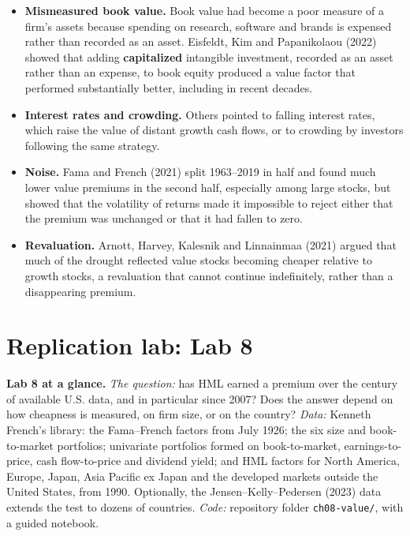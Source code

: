 \begin{itemize}
  \item \textbf{Mismeasured book value.} Book value had become a poor measure of a firm's assets because spending on research, software and brands is expensed rather than recorded as an asset. Eisfeldt, Kim and Papanikolaou (2022) showed that adding \textbf{capitalized} intangible investment, recorded as an asset rather than an expense, to book equity produced a value factor that performed substantially better, including in recent decades.
  \item \textbf{Interest rates and crowding.} Others pointed to falling interest rates, which raise the value of distant growth cash flows, or to crowding by investors following the same strategy.
  \item \textbf{Noise.} Fama and French (2021) split 1963--2019 in half and found much lower value premiums in the second half, especially among large stocks, but showed that the volatility of returns made it impossible to reject either that the premium was unchanged or that it had fallen to zero.
  \item \textbf{Revaluation.} Arnott, Harvey, Kalesnik and Linnainmaa (2021) argued that much of the drought reflected value stocks becoming cheaper relative to growth stocks, a revaluation that cannot continue indefinitely, rather than a disappearing premium.
\end{itemize}

\section{Replication lab: Lab 8}
\label{sec:08-lab}

\begin{callout}
\textbf{Lab 8 at a glance.} \emph{The question:} has HML earned a premium over the century of available U.S. data, and in particular since 2007? Does the answer depend on how cheapness is measured, on firm size, or on the country? \emph{Data:} Kenneth French's library: the Fama--French factors from July 1926; the six size and book-to-market portfolios; univariate portfolios formed on book-to-market, earnings-to-price, cash flow-to-price and dividend yield; and HML factors for North America, Europe, Japan, Asia Pacific ex Japan and the developed markets outside the United States, from 1990. Optionally, the Jensen--Kelly--Pedersen (2023) data extends the test to dozens of countries. \emph{Code:} repository folder \texttt{ch08-value/}, with a guided notebook.
\end{callout}

